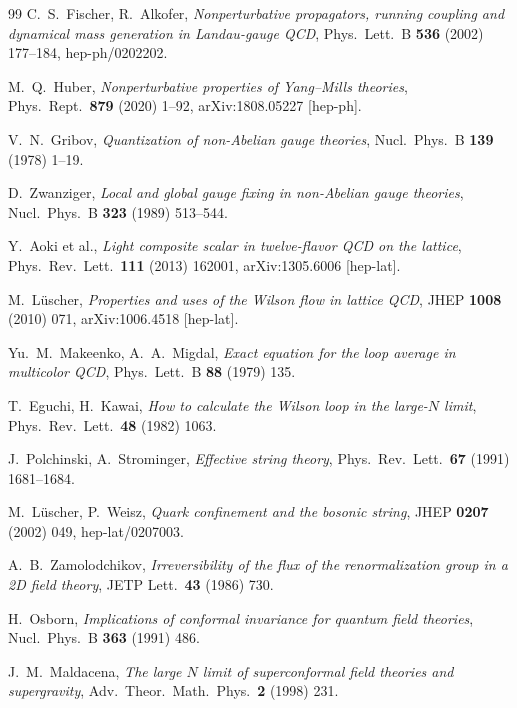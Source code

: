 {\begin{thebibliography}{99}
 C.~S.~Fischer, R.~Alkofer, \emph{Nonperturbative propagators, running
  coupling and dynamical mass generation in Landau-gauge QCD}, Phys.\ Lett.\ B \textbf{536}
  (2002) 177--184, hep-ph/0202202.

 M.~Q.~Huber, \emph{Nonperturbative properties of Yang--Mills theories},
  Phys.\ Rept.\ \textbf{879} (2020) 1--92, arXiv:1808.05227 [hep-ph].

 V.~N.~Gribov, \emph{Quantization of non-Abelian gauge theories}, Nucl.\ Phys.\
  B \textbf{139} (1978) 1--19.

 D.~Zwanziger, \emph{Local and global gauge fixing in non-Abelian gauge
  theories}, Nucl.\ Phys.\ B \textbf{323} (1989) 513--544.

 Y.~Aoki et al., \emph{Light composite scalar in twelve-flavor QCD on the
  lattice}, Phys.\ Rev.\ Lett.\ \textbf{111} (2013) 162001, arXiv:1305.6006 [hep-lat].

 M.~L\"uscher, \emph{Properties and uses of the Wilson flow in lattice
  QCD}, JHEP \textbf{1008} (2010) 071, arXiv:1006.4518 [hep-lat].

 Yu.~M.~Makeenko, A.~A.~Migdal, \emph{Exact equation for the loop
  average in multicolor QCD}, Phys.\ Lett.\ B \textbf{88} (1979) 135.

 T.~Eguchi, H.~Kawai, \emph{How to calculate the Wilson loop in the
  large-$N$ limit}, Phys.\ Rev.\ Lett.\ \textbf{48} (1982) 1063.

 J.~Polchinski, A.~Strominger, \emph{Effective string theory},
  Phys.\ Rev.\ Lett.\ \textbf{67} (1991) 1681--1684.

 M.~L\"uscher, P.~Weisz, \emph{Quark confinement and the bosonic string},
  JHEP \textbf{0207} (2002) 049, hep-lat/0207003.

 A.~B.~Zamolodchikov, \emph{Irreversibility of the flux of the
  renormalization group in a 2D field theory}, JETP Lett.\ \textbf{43} (1986) 730.

 H.~Osborn, \emph{Implications of conformal invariance for quantum field
  theories}, Nucl.\ Phys.\ B \textbf{363} (1991) 486.

 J.~M.~Maldacena, \emph{The large $N$ limit of superconformal field theories
  and supergravity}, Adv.\ Theor.\ Math.\ Phys.\ \textbf{2} (1998) 231.


\end{thebibliography}}

